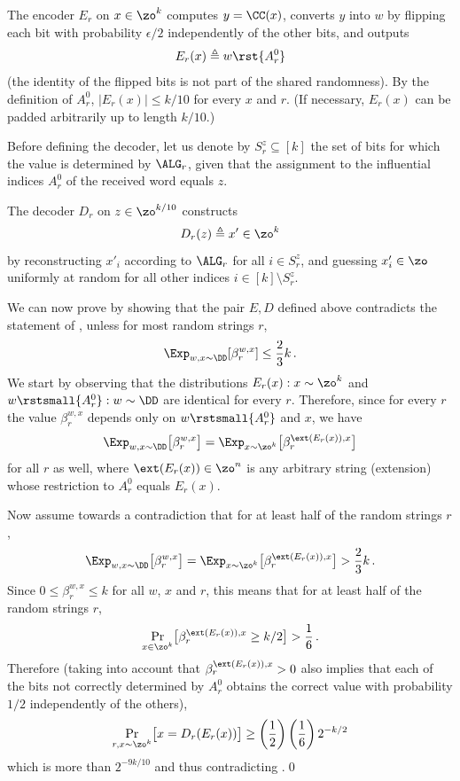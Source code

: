 The encoder $E_r$ on $x \in \zo^k$ computes $y = \CC(x)$, converts $y$
into $w$ by flipping each bit with probability $\epsilon/2$
independently of the other bits, and outputs
\[
E_r(x) \triangleq w\rst{A_r^0}
\]
(the identity of the flipped bits is not part of the shared randomness). By the definition of $A_r^0$, $|E_r(x)| \leq k/10$ for every $x$ and $r$. (If necessary, $E_r(x)$ can be padded arbitrarily up to length $k/10$.)

Before defining the decoder, let us denote by $S^z_r \subseteq [k]$ the set of bits for which the value is determined by $\ALG_r$, given that the assignment to the influential indices $A_r^0$ of the received word equals $z$.

The decoder $D_r$ on $z \in \zo^{k/10}$ constructs
\[
D_r(z) \triangleq x' \in \zo^k
\]
by reconstructing $x'_i$ according to $\ALG_r$ for all $i \in S_r^z$, and guessing $x'_i \in \zo$ uniformly at random for all other indices $i \in [k] \setminus S_r^z$.

We can now prove  by showing that the pair
$E,D$ defined above contradicts the statement of
, unless for most random strings $r$,
\[
\Exp_{w,x \sim \DD} [ \beta_r^{w,x} ] \leq \frac{2}{3}k\,.
\]
We start by observing that the distributions $E_r(x):x \sim \zo^k$ and
$w\rstsmall{A_r^0}:w \sim \DD$ are identical for every $r$. Therefore,
since for every $r$ the value $\beta_r^{w,x}$ depends only on
$w\rstsmall{A_r^0}$ and $x$, we have
\[
\Exp_{w,x \sim \DD} \bigl[ \beta_r^{w,x} \bigr] =  \Exp_{x \sim \zo^k}
\bigl[ \beta_r^{\ext(E_r(x)),x}\bigr]
\]
for all $r$ as well, where $\ext(E_r(x)) \in \zo^n$ is any arbitrary  string (extension) whose restriction to $A_r^0$ equals $E_r(x)$.

Now assume towards a contradiction that for at least half of the
random strings $r$, \[
\Exp_{w,x \sim \DD} \bigl[ \beta_r^{w,x} \bigr]  = \Exp_{x \sim \zo^k}
\bigl[ \beta_r^{\ext(E_r(x)),x}\bigr] > \frac{2}{3}k\,.
\]
Since $0 \leq \beta_r^{w,x} \leq k$ for all $w$, $x$ and $r$, this
means that for at least half of the random strings $r$, 
\[
\Pr_{x \in \zo^k}\bigl[\beta_r^{\ext(E_r(x)),x} \geq k/2\bigr] >\frac{1}{6}\,.
\]
Therefore (taking into account that $\beta_r^{\ext(E_r(x)),x}>0$ also
implies that each of the bits not correctly determined by $A_r^0$
obtains the correct value with probability $1/2$ independently of
the others), 
\[
\Pr_{r,x \sim \zo^k}\bigl[x = D_r(E_r(x))\bigr] \geq
\left(\frac{1}{2}\right)\left(\frac{1}{6}\right) 2^{-k/2}
\]
which is more than $2^{-9k/10}$ and thus contradicting .\hfill\qed




